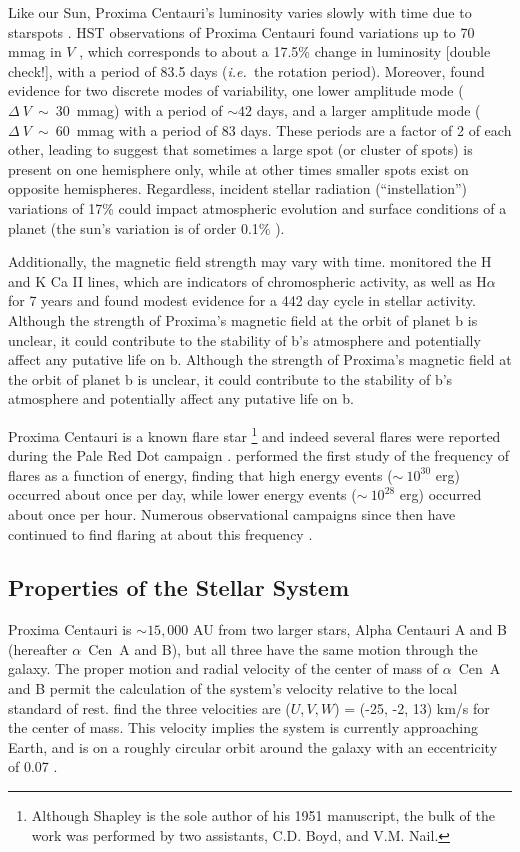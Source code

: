 \documentclass[preprint,12pt]{aastex}
\newcommand{\xxx}[1]{{\color{red} #1}} %
\def\ie{{\it i.e.\ }}
\def\acen{{$\alpha$~Cen}}
\begin{document}
Like our Sun, Proxima Centauri's luminosity varies slowly with time
due to starspots \citep{Benedict93}. HST observations of Proxima
Centauri found variations up to 70 mmag in $V$ \citep{Benedict98},
which corresponds to about a 17.5\% change in luminosity \xxx{[double check!]}, with a period of 83.5 days
(\ie the rotation period). Moreover, \citep{Benedict98} found evidence
for two discrete modes of variability, one lower amplitude mode
($\Delta~V~\sim~30$~mmag) with a period of $\sim 42$ days, and a
larger amplitude mode ($\Delta~V~\sim~60$~mmag with a period of 83
days. These periods are a factor of 2 of each other, leading
\cite{Benedict98} to suggest that sometimes a large spot (or cluster
of spots) is present on one hemisphere only, while at other times
smaller spots exist on opposite hemispheres. Regardless, incident
stellar radiation (``instellation'') variations of 17\% could impact
atmospheric evolution and surface conditions of a planet (the sun's
variation is of order 0.1\% \citep{Willson81}).

Additionally, the magnetic field strength may vary with
time. \cite{Cincunegui07} monitored the H and K Ca II lines, which are
indicators of chromospheric activity, as well as H$\alpha$ for 7 years
and found modest evidence for a 442 day cycle in stellar
activity. Although the strength of Proxima's magnetic field at the
orbit of planet b is unclear, it could contribute to the stability of
b's atmosphere and potentially affect any putative life on b. Although
the strength of Proxima's magnetic field at the orbit of planet b is
unclear, it could contribute to the stability of b's atmosphere and
potentially affect any putative life on b.

Proxima Centauri is a known flare star
\citep{Shapley51}\footnote{Although Shapley is the sole author of his
  1951 manuscript, the bulk of the work was performed by two
  assistants, C.D. Boyd, and V.M. Nail.}  and indeed several flares
were reported during the Pale Red Dot campaign
\citep{AngladaEscude16}. \cite{Walker81} performed the first study of
the frequency of flares as a function of energy, finding that high
energy events ($\sim~10^{30}$ erg) occurred about once per day, while
lower energy events ($\sim~10^{28}$ erg) occurred about once per
hour. Numerous observational campaigns since then have continued to
find flaring at about this frequency
\citep{Benedict98,AngladaEscude16}.

\subsection{Properties of the Stellar System}
\label{sec:obs:stellarsys}
Proxima Centauri is $\sim 15,000$ AU from two larger stars, Alpha
Centauri A and B (hereafter \acen~A and B), but all three have the
same motion through the galaxy. The proper motion and radial
velocity of the center of mass of \acen~A and B permit the calculation
of the system's velocity relative to the local standard of
rest. \cite{Poveda96} find the three velocities are ($U, V, W$) =
(-25, -2, 13) km/s for the center of mass. This velocity implies the
system is currently approaching Earth, and is on a roughly circular
orbit around the galaxy with an eccentricity of 0.07
\citep{AllenHerrera98}.
\end{document}
